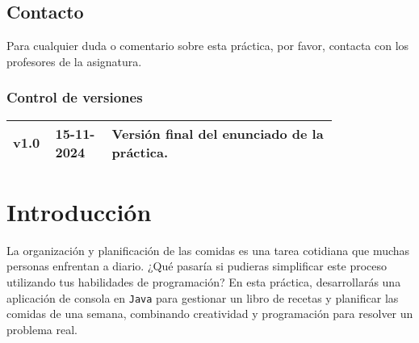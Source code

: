 \documentclass[
    a4paper, %
    12pt, %
]{CSSullivanBusinessReport}
\begin{document}
\begin{twothirdswidth}
    \subsection*{Contacto}
    
    Para cualquier duda o comentario sobre esta práctica, por favor, contacta con los profesores de la asignatura.
    
    \vfill %
    
    \subsubsection*{Control de versiones}
    
    \scriptsize %
    
    \begin{tabular}{@{} L{0.05\linewidth} L{0.15\linewidth} L{0.6\linewidth} @{}} %
        \toprule
        v1.0 & 15-11-2024 & Versión final del enunciado de la práctica.\\
        \bottomrule
    \end{tabular}
\end{twothirdswidth}

\newpage


\begin{twothirdswidth} %
    \tableofcontents %
\end{twothirdswidth}

\newpage


\section{Introducción}
La organización y planificación de las comidas es una tarea cotidiana que muchas personas enfrentan a diario. ¿Qué pasaría si pudieras simplificar este proceso utilizando tus habilidades de programación? En esta práctica, desarrollarás una aplicación de consola en \texttt{Java} para gestionar un libro de recetas y planificar las comidas de una semana, combinando creatividad y programación para resolver un problema real.
\end{document}
